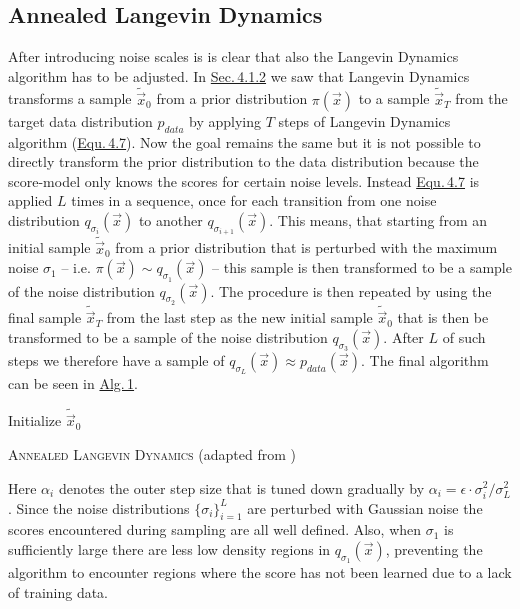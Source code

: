 \subsection{Annealed Langevin Dynamics} \label{4.3.2}
After introducing noise scales is is clear that also the Langevin Dynamics algorithm has to be adjusted. In \hyperref[sec:4.1.2]{Sec.\,4.1.2} we saw that Langevin Dynamics transforms a sample $\tilde{\vec{x}}_0$ from a prior distribution $\pi(\vec{x})$ to a sample $\tilde{\vec{x}}_T$ from the target data distribution $p_{data}$ by applying $T$ steps of Langevin Dynamics algorithm (\hyperref[equ:4.7]{Equ.\,4.7}). Now the goal remains the same but it is not possible to directly transform the prior distribution to the data distribution because the score-model only knows the scores for certain noise levels. Instead \hyperref[equ:4.7]{Equ.\,4.7} is applied $L$ times in a sequence, once for each transition from one noise distribution $q_{\sigma_i}(\vec{x})$ to another $q_{\sigma_{i+1}}(\vec{x})$. This means, that starting from an initial sample $\tilde{\vec{x}}_0$ from a prior distribution that is perturbed with the maximum noise $\sigma_1$ – i.e. $\pi(\vec{x})\sim q_{\sigma_1}(\vec{x})$ – this sample is then transformed to be a sample of the noise distribution $q_{\sigma_{2}}(\vec{x})$. The procedure is then repeated by using the final sample $\tilde{\vec{x}}_T$ from the last step as the new initial sample $\tilde{\vec{x}}_0$ that is then be transformed to be a sample of the noise distribution $q_{\sigma_{3}}(\vec{x})$. After $L$ of such steps we therefore have a sample of $q_{\sigma_L}(\vec{x})\approx p_{data}(\vec{x})$. The final algorithm can be seen in \hyperref[alg:1]{Alg.\,1}.
%
\begin{algorithm} \label{alg:1}
    \DontPrintSemicolon
    Initialize $\tilde{\vec{x}}_0$\;
    \caption{\textsc{Annealed Langevin Dynamics} (adapted from \cite{score_1})}
\end{algorithm}

Here $\alpha_i$ denotes the outer step size that is tuned down gradually by $\alpha_i=\epsilon\cdot\sigma_i^2/\sigma_L^2$. Since the noise distributions $\{\sigma_i\}_{i=1}^L$ are perturbed with Gaussian noise the scores encountered during sampling are all well defined. Also, when $\sigma_1$ is sufficiently large there are less low density regions in $q_{\sigma_1}(\vec{x})$, preventing the algorithm to encounter regions where the score has not been learned due to a lack of training data.

